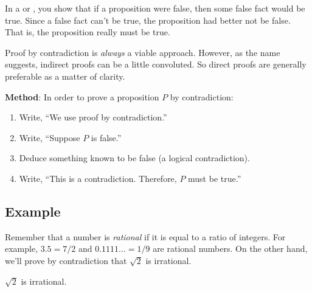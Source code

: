 
In a  or , you show that
if a proposition were false, then some false fact would be true.  Since a
false fact can't be true, the proposition had better not be false.  That
is, the proposition really must be true.  \iffalse So proof by
contradiction would be described by the inference rule
\begin{rul*}
\Rule{\neg P \implies \false}{P}
\end{rul*}
\fi

Proof by contradiction is \textit{always} a viable approach.  However, as
the name suggests, indirect proofs can be a little convoluted.  So direct
proofs are generally preferable as a matter of clarity.

\textbf{Method}: In order to prove a proposition $P$ by contradiction:

\begin{enumerate}

\item Write, ``We use proof by contradiction.''

\item Write, ``Suppose $P$ is false.''

\item Deduce something known to be false (a logical contradiction).

\item Write, ``This is a contradiction.  Therefore, $P$ must be
true.''

\end{enumerate}

\subsection*{Example}

Remember that a number is \textit{rational} if it is equal to a ratio
of integers.  For example, $3.5 = 7/2$ and $0.1111\dots = 1/9$ are
rational numbers.  On the other hand, we'll prove by contradiction
that $\sqrt{2}$ is irrational.

\begin{theorem}
$\sqrt{2}$ is irrational.
\end{theorem}

